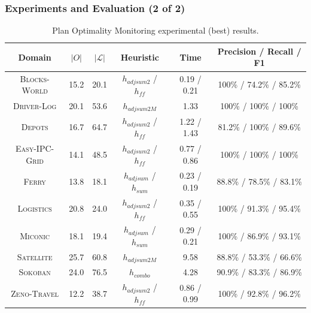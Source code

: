\documentclass{beamer}
\begin{document}
\begin{frame}[c]\frametitle{Experiments and Evaluation (2 of 2)}
	\begin{table}[]
		\scriptsize
		\centering
		\begin{tabular}{|c|c|c|c|cc|}
		\hline
		\textbf{Domain}             & $|O|$  & $|\mathcal{L}|$  & \textbf{Heuristic}          & \textbf{Time}        & \textbf{Precision / Recall / F1} \\ \hline
		\textsc{Blocks-World}  & 15.2 & 20.1 & $h_{adjsum2}$ / $h_{ff}$ 	& 0.19 / 0.21 & 100\% / 74.2\% / 85.2\%       \\ \hline
		\textsc{Driver-Log}    & 20.1 & 53.6 & $h_{adjsum2M}$            & 1.33        & 100\% / 100\% / 100\% 	  	  \\ \hline
		\textsc{Depots}        & 16.7 & 64.7 & $h_{adjsum2}$ / $h_{ff}$  & 1.22 / 1.43 & 81.2\% / 100\% / 89.6\%       \\ \hline
		\textsc{Easy-IPC-Grid} & 14.1 & 48.5 & $h_{adjsum2}$ / $h_{ff}$  & 0.77 / 0.86 & 100\% / 100\% / 100\%         \\ \hline
		\textsc{Ferry} 		  & 13.8 & 18.1 & $h_{adjsum}$ / $h_{sum}$  & 0.23 / 0.19 & 88.8\% / 78.5\% / 83.1\%        \\ \hline
		\textsc{Logistics}     & 20.8 & 24.0 & $h_{adjsum2}$ / $h_{ff}$  & 0.35 / 0.55 & 100\% / 91.3\% / 95.4\%       \\ \hline
		\textsc{Miconic}       & 18.1 & 19.4 & $h_{adjsum}$ / $h_{sum}$  & 0.29 / 0.21 & 100\% / 86.9\% / 93.1\%       \\ \hline
		\textsc{Satellite}     & 25.7 & 60.8 & $h_{adjsum2M}$        	& 9.58 		  & 88.8\% / 53.3\% / 66.6\%       \\ \hline
		\textsc{Sokoban}       & 24.0 & 76.5 & $h_{combo}$           	& 4.28		  & 90.9\% / 83.3\% / 86.9\%       \\ \hline
		\textsc{Zeno-Travel}   & 12.2 & 38.7 & $h_{adjsum2}$ / $h_{ff}$  & 0.86 / 0.99 & 100\% / 92.8\% / 96.2\%       \\ \hline
		\end{tabular}
        \caption{Plan Optimality Monitoring experimental (best) results.}
	\end{table}
\end{frame}	
\end{document}
